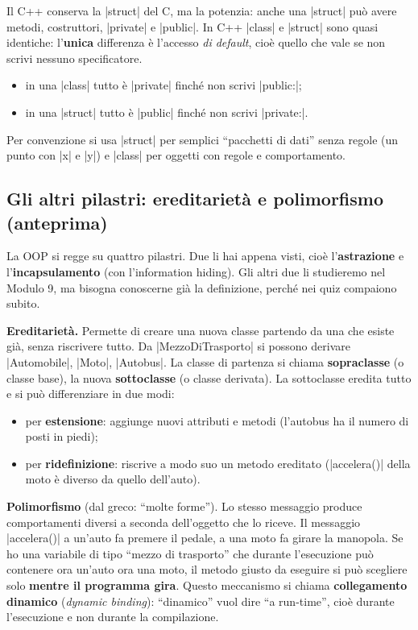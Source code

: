 Il C++ conserva la \cc|struct| del C, ma la potenzia: anche una \cc|struct| può
avere metodi, costruttori, \cc|private| e \cc|public|. In C++ \cc|class| e
\cc|struct| sono quasi identiche: l'\textbf{unica} differenza è l'accesso
\emph{di default}, cioè quello che vale se non scrivi nessuno specificatore.
\begin{itemize}
  \item in una \cc|class| tutto è \cc|private| finché non scrivi \cc|public:|;
  \item in una \cc|struct| tutto è \cc|public| finché non scrivi \cc|private:|.
\end{itemize}
Per convenzione si usa \cc|struct| per semplici ``pacchetti di dati'' senza
regole (un punto con \cc|x| e \cc|y|) e \cc|class| per oggetti con regole e
comportamento.

\subsection*{Gli altri pilastri: ereditarietà e polimorfismo (anteprima)}

La OOP si regge su quattro pilastri. Due li hai appena visti, cioè
l'\textbf{astrazione} e l'\textbf{incapsulamento} (con l'information hiding).
Gli altri due li studieremo nel Modulo 9, ma bisogna conoscerne già la
definizione, perché nei quiz compaiono subito.

\textbf{Ereditarietà.} Permette di creare una nuova classe partendo da una che
esiste già, senza riscrivere tutto. Da \cc|MezzoDiTrasporto| si possono derivare
\cc|Automobile|, \cc|Moto|, \cc|Autobus|. La classe di partenza si chiama
\textbf{sopraclasse} (o classe base), la nuova \textbf{sottoclasse} (o classe
derivata). La sottoclasse eredita tutto e si può differenziare in due modi:
\begin{itemize}
  \item per \textbf{estensione}: aggiunge nuovi attributi e metodi (l'autobus ha
        il numero di posti in piedi);
  \item per \textbf{ridefinizione}: riscrive a modo suo un metodo ereditato
        (\cc|accelera()| della moto è diverso da quello dell'auto).
\end{itemize}

\textbf{Polimorfismo} (dal greco: ``molte forme''). Lo stesso messaggio produce
comportamenti diversi a seconda dell'oggetto che lo riceve. Il messaggio
\cc|accelera()| a un'auto fa premere il pedale, a una moto fa girare la
manopola. Se ho una variabile di tipo ``mezzo di trasporto'' che durante
l'esecuzione può contenere ora un'auto ora una moto, il metodo giusto da
eseguire si può scegliere solo \textbf{mentre il programma gira}. Questo
meccanismo si chiama \textbf{collegamento dinamico} (\emph{dynamic binding}):
``dinamico'' vuol dire ``a run-time'', cioè durante l'esecuzione e non durante la
compilazione.

